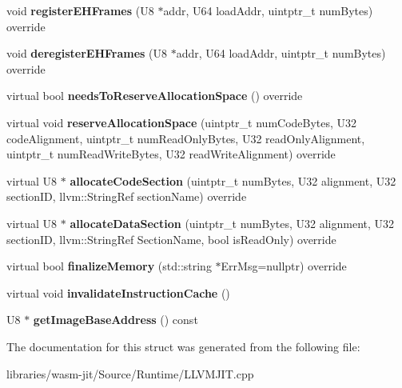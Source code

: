 \begin{DoxyCompactItemize}
\item 
\mbox{\label{struct_l_l_v_m_j_i_t_1_1_unit_memory_manager_a6c3d2f63cbc13c4043de3896e5c919d6}} 
void {\bfseries register\+E\+H\+Frames} (U8 $\ast$addr, U64 load\+Addr, uintptr\+\_\+t num\+Bytes) override
\item 
\mbox{\label{struct_l_l_v_m_j_i_t_1_1_unit_memory_manager_a44a8e9be2fa62ba4fcd41369f1a45f4f}} 
void {\bfseries deregister\+E\+H\+Frames} (U8 $\ast$addr, U64 load\+Addr, uintptr\+\_\+t num\+Bytes) override
\item 
\mbox{\label{struct_l_l_v_m_j_i_t_1_1_unit_memory_manager_aaab997bb02fc83b984ad19a02b69eacb}} 
virtual bool {\bfseries needs\+To\+Reserve\+Allocation\+Space} () override
\item 
\mbox{\label{struct_l_l_v_m_j_i_t_1_1_unit_memory_manager_a365b4465df713d3e1052c8f0a5cc89d9}} 
virtual void {\bfseries reserve\+Allocation\+Space} (uintptr\+\_\+t num\+Code\+Bytes, U32 code\+Alignment, uintptr\+\_\+t num\+Read\+Only\+Bytes, U32 read\+Only\+Alignment, uintptr\+\_\+t num\+Read\+Write\+Bytes, U32 read\+Write\+Alignment) override
\item 
\mbox{\label{struct_l_l_v_m_j_i_t_1_1_unit_memory_manager_a7aa6ed100fb7a7e93b1740cc8110fd43}} 
virtual U8 $\ast$ {\bfseries allocate\+Code\+Section} (uintptr\+\_\+t num\+Bytes, U32 alignment, U32 section\+ID, llvm\+::\+String\+Ref section\+Name) override
\item 
\mbox{\label{struct_l_l_v_m_j_i_t_1_1_unit_memory_manager_ab2d8be9136eb4cccec37a0a6e022db62}} 
virtual U8 $\ast$ {\bfseries allocate\+Data\+Section} (uintptr\+\_\+t num\+Bytes, U32 alignment, U32 section\+ID, llvm\+::\+String\+Ref Section\+Name, bool is\+Read\+Only) override
\item 
\mbox{\label{struct_l_l_v_m_j_i_t_1_1_unit_memory_manager_a021ca70d100b6c236b3e7d6cdf3a6d29}} 
virtual bool {\bfseries finalize\+Memory} (std\+::string $\ast$Err\+Msg=nullptr) override
\item 
\mbox{\label{struct_l_l_v_m_j_i_t_1_1_unit_memory_manager_aaef1ea4d67e3d8f14941b9792a5a1a88}} 
virtual void {\bfseries invalidate\+Instruction\+Cache} ()
\item 
\mbox{\label{struct_l_l_v_m_j_i_t_1_1_unit_memory_manager_ac4185712e0239076527db555c354f9b1}} 
U8 $\ast$ {\bfseries get\+Image\+Base\+Address} () const
\end{DoxyCompactItemize}


The documentation for this struct was generated from the following file\+:\begin{DoxyCompactItemize}
\item 
libraries/wasm-\/jit/\+Source/\+Runtime/L\+L\+V\+M\+J\+I\+T.\+cpp\end{DoxyCompactItemize}
